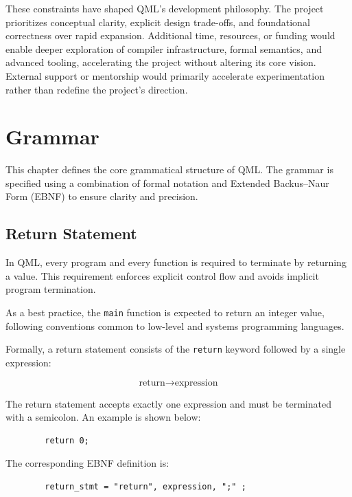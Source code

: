\documentclass[12pt]{report}
\begin{document}
	These constraints have shaped QML’s development philosophy. The project prioritizes conceptual clarity, explicit design trade-offs, and foundational correctness over rapid expansion. Additional time, resources, or funding would enable deeper exploration of compiler infrastructure, formal semantics, and advanced tooling, accelerating the project without altering its core vision. External support or mentorship would primarily accelerate experimentation rather than redefine the project’s direction.
	
	
	\chapter{Grammar}
	\label{sec:gramm}
	
	This chapter defines the core grammatical structure of QML. The grammar is specified using a combination of formal notation and Extended Backus--Naur Form (EBNF) to ensure clarity and precision.
	
	\section{Return Statement}
	
	In QML, every program and every function is required to terminate by returning a value. This requirement enforces explicit control flow and avoids implicit program termination.
	
	\begin{notebox}
		As a best practice, the \texttt{main} function is expected to return an integer value, following conventions common to low-level and systems programming languages.
	\end{notebox}
	
	Formally, a return statement consists of the \texttt{return} keyword followed by a single expression:
	
	\[
		\text{return} \rightarrow \text{expression}
	\]
	
	The return statement accepts exactly one expression and must be terminated with a semicolon. An example is shown below:
	
	\begin{verbatim}
		return 0;
	\end{verbatim}
	
	The corresponding EBNF definition is:
	
	\begin{verbatim}
		return_stmt = "return", expression, ";" ;
	\end{verbatim}
	
\end{document}
